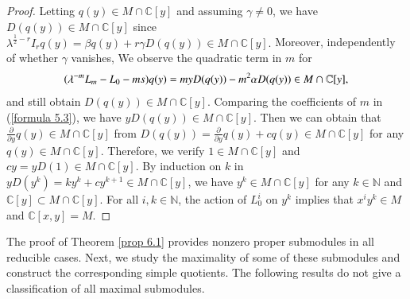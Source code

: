 \documentclass[12pt,reqno]{amsart}
\def\N{\mathbb{N}}
\def\C{\mathbb{C}}
\numberwithin{equation}{section}
\begin{document}
\begin{proof}
Letting $q(y)\in M\cap \C[y]$ and assuming $\gamma\neq 0$, we have $D(q(y))\in M\cap \C[y]$ 
since $\lambda^{\frac{1}{2}-r}I_{r}q(y)=\beta q(y)+r\gamma D(q(y))\in M\cap \C[y].$
Moreover, independently of whether $\gamma$ vanishes,
We observe the quadratic term in $m$ for 
\begin{equation}\label{formula 5.3}
\aligned
(\lambda^{-m}L_{m}-L_0-ms)q(y)=myD(q(y))-m^2\alpha D(q(y))\in M\cap \C[y],
\endaligned
\end{equation} 
and still obtain $D(q(y))\in M\cap \C[y]$. Comparing the coefficients of $m$ in (\ref{formula 5.3}), we have $yD(q(y))\in M\cap \C[y]$. Then we can obtain that $\frac{\partial}{\partial{y}}q(y)\in M\cap \C[y]$ from $D(q(y))=\frac{\partial}{\partial{y}}q(y)+cq(y)\in M\cap \C[y]$ for any $q(y)\in M\cap \C[y]$. Therefore, we verify $1\in M\cap \C[y]$ and $cy=yD(1)\in M\cap \C[y]$. By induction on $k$ in $yD(y^k)=ky^k+cy^{k+1}\in M\cap \C[y]$, we  have $y^k\in M\cap \C[y]$ for any $k\in\N$ and $\C[y]\subset M\cap \C[y]$. For all $i,k\in\N$, the action of $L_{0}^i$ on $y^k$ implies that $x^iy^k\in M$ and $\C[x,y]= M$. 
\end{proof}


















The proof of Theorem \ref{prop 6.1} provides nonzero proper submodules in all reducible cases. Next, we study the maximality of some of these submodules and construct the corresponding simple quotients. The following results do not give a classification of all maximal submodules.
\end{document}
